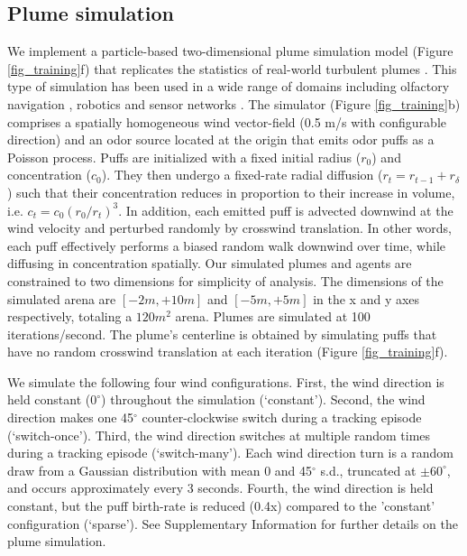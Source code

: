\documentclass[5p,twocolumn,authoryear]{elsarticle}
\begin{document}
\subsection*{Plume simulation}
\label{sec_methods_plume}
We implement a particle-based two-dimensional plume simulation model (Figure \ref{fig_training}f) that replicates the statistics of real-world turbulent plumes \citep{farrell2002filament}.
This type of simulation has been used in a wide range of domains including olfactory navigation \citep{carde2008navigational}, robotics \citep{kowadlo2008robot} and sensor networks \citep{michaelides2005plume}. 
The simulator (Figure \ref{fig_training}b) comprises a spatially homogeneous wind vector-field (0.5 m/s with configurable direction) and an odor source located at the origin that emits odor puffs as a Poisson process.
Puffs are initialized with a fixed initial radius ($r_0$) and concentration ($c_{0}$).
They then undergo a fixed-rate radial diffusion ($r_{t} = r_{t-1} + r_{\delta} $) such that their concentration reduces in proportion to their increase in volume, i.e.
$ c_{t} = c_{0} \left( {r_{0}}/{r_{t}} \right)^3 $.
In addition, each emitted puff is advected downwind at the wind velocity and perturbed randomly by crosswind translation.
In other words, each puff effectively performs a biased random walk downwind over time, while diffusing in concentration spatially.
Our simulated plumes and agents are constrained to two dimensions for simplicity of analysis.
The dimensions of the simulated arena are $[-2m,+10m]$ and $[-5m, +5m]$ in the x and y axes respectively, totaling a $120m^2$ arena.
Plumes are simulated at 100 iterations/second. 
The plume's centerline is obtained by simulating puffs that have no random crosswind translation at each iteration (Figure \ref{fig_training}f).  

We simulate the following four wind configurations. 
First, the wind direction is held constant ($0^{\circ}$) throughout the simulation (`constant').
Second, the wind direction makes one 45$^{\circ}$ counter-clockwise switch during a tracking episode (`switch-once'). 
Third, the wind direction switches at multiple random times during a tracking episode (`switch-many').
Each wind direction turn is a random draw from a Gaussian distribution with mean $0$ and 45$^{\circ}$ s.d., truncated at $\pm 60^{\circ}$, and occurs approximately every 3 seconds.
Fourth, the wind direction is held constant, but the puff birth-rate is reduced (0.4x) compared to the 'constant' configuration (`sparse').
See Supplementary Information for further details on the plume simulation.
\end{document}
